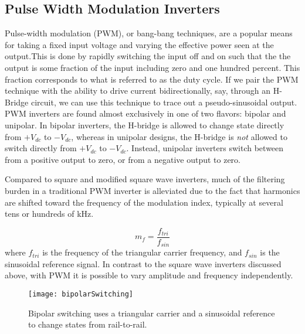 \subsection{Pulse Width Modulation Inverters}
\label{pwmApproach}

Pulse-width modulation (PWM), or bang-bang techniques, are a popular means for taking a fixed input voltage and varying the effective power seen at the output.This is done by rapidly switching the input off and on such that the the output is some fraction of the input including zero and one hundred percent. This fraction corresponds to what is referred to as the duty cycle. If we pair the PWM technique with the ability to drive current bidirectionally, say, through an H-Bridge circuit, we can use this technique to trace out a pseudo-sinusoidal output. PWM inverters are found almost exclusively in one of two flavors: bipolar and unipolar. In bipolar inverters, the H-bridge is allowed to change state directly from $+V_{dc}$ to $-V_{dc}$, whereas in unipolar designs, the H-bridge is \emph{not} allowed to switch directly from $+V_{dc}$ to $-V_{dc}$. Instead, unipolar inverters switch between from a positive output to zero, or from a negative output to zero.

Compared to square and modified square wave inverters, much of the filtering burden in a traditional PWM inverter is alleviated due to the fact that harmonics are shifted toward the frequency of the modulation index, typically at several tens or hundreds of kHz.

\begin{equation}
m_f=\frac{f_{tri}}{f_{sin}}
\end{equation}
where $f_{tri}$ is the frequency of the triangular carrier frequency, and $f_{sin}$ is the sinusoidal reference signal. In contrast to the square wave inverters discussed above, with PWM it is possible to vary amplitude and frequency independently. 

\begin{figure}[h]
\centering
\texttt{[image: bipolarSwitching]}
\caption{Bipolar switching uses a triangular carrier and a sinusoidal reference to change states from rail-to-rail. \cite{inverterFourier}}
\label{bipolar}
\end{figure}

